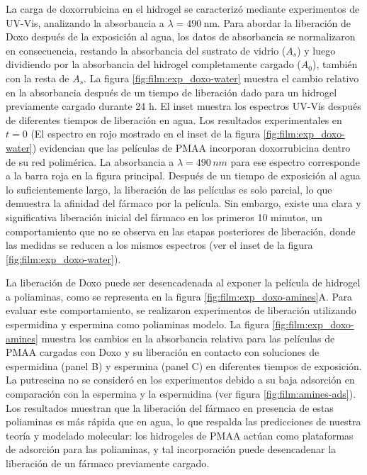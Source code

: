 La carga de doxorrubicina en el hidrogel se caracteriz\'o mediante experimentos de UV-Vis, analizando la absorbancia a $\lambda=490\:$nm. Para abordar la liberaci\'on de Doxo despu\'es de la exposici\'on al agua, los datos de absorbancia se normalizaron en consecuencia, restando la absorbancia del sustrato de vidrio ($A_s$) y luego dividiendo por la absorbancia del hidrogel completamente cargado ($A_0$), tambi\'en con la resta de $A_s$. La figura \ref{fig:film:exp_doxo-water} muestra el cambio relativo en la absorbancia despu\'es de un tiempo de liberaci\'on dado para un hidrogel previamente cargado durante 24 h. El inset muestra los espectros UV-Vis despu\'es de diferentes tiempos de liberaci\'on en agua. Los resultados experimentales en $t=0$ (El espectro en rojo mostrado en el inset de la figura \ref{fig:film:exp_doxo-water}) evidencian que las pel\'iculas de PMAA incorporan doxorrubicina dentro de su red polim\'erica. La absorbancia a $\lambda=490\, nm$ para ese espectro corresponde a la barra roja en la figura principal. Despu\'es de un tiempo de exposici\'on al agua lo suficientemente largo, la liberaci\'on de las pel\'iculas es solo parcial, lo que demuestra la afinidad del f\'armaco por la pel\'icula. Sin embargo, existe una clara y significativa liberaci\'on inicial del f\'armaco en los primeros 10 minutos, un comportamiento que no se observa en las etapas posteriores de liberaci\'on, donde las medidas se reducen a los mismos espectros (ver el inset de la figura \ref{fig:film:exp_doxo-water}).


La liberaci\'on de Doxo puede ser desencadenada al exponer la pel\'icula de hidrogel a poliaminas, como se representa en la figura \ref{fig:film:exp_doxo-amines}A. Para evaluar este comportamiento, se realizaron experimentos de liberaci\'on utilizando espermidina y espermina como poliaminas modelo. La  figura \ref{fig:film:exp_doxo-amines} muestra los cambios en la absorbancia relativa para las pel\'iculas de PMAA cargadas con Doxo y su liberaci\'on en contacto con soluciones de espermidina (panel B) y espermina (panel C) en diferentes tiempos de exposici\'on. La putrescina no se consider\'o en los experimentos debido a su baja adsorci\'on en comparaci\'on con la espermina y la espermidina (ver figura \ref{fig:film:amines-ads}). Los resultados muestran que la liberaci\'on del f\'armaco en presencia de estas poliaminas es m\'as r\'apida que en agua, lo que respalda las predicciones de nuestra teor\'ia y modelado molecular: los hidrogeles de PMAA act\'uan como plataformas de adsorci\'on para las poliaminas, y tal incorporaci\'on puede desencadenar la liberaci\'on de un f\'armaco previamente cargado.





